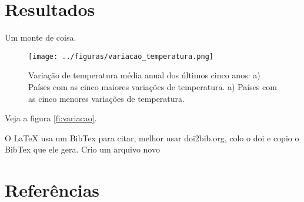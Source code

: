 \documentclass{article}
\begin{document}
\section{Resultados}

Um monte de coisa.

\begin{figure}[tb!] 
	\centering
	\texttt{[image: ../figuras/variacao\_temperatura.png]}
	\caption{
	Variação de temperatura média anual dos últimos cinco anos:
	a) Países com as cinco maiores variações de temperatura.
	a) Países com as cinco menores variações de temperatura.
	}
	\label{fig:variacao}
\end{figure}

Veja a figura \ref{fi:variacao}.


O LaTeX usa um BibTex para citar, melhor usar doi2bib.org, colo o doi e copio o 
BibTex que ele gera.
Crio um arquivo novo
\section{Referências}




\end{document}
